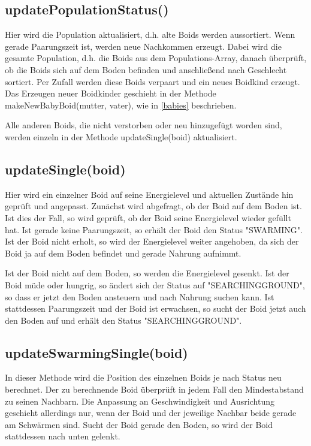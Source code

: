 \documentclass[draft=false
              ,paper=a4
              ,twoside=false
              ,fontsize=11pt
              ,headsepline
              ,BCOR10mm
              ,DIV11
              ,bibtotoc
              ,liststotoc
              ]{scrbook}
\begin{document}
\subsection{updatePopulationStatus()}
 Hier wird die Population aktualisiert, d.h. alte Boids werden aussortiert. Wenn gerade Paarungszeit ist, werden neue Nachkommen erzeugt. Dabei wird die gesamte Population, d.h. die Boids aus dem Populations-Array, danach überprüft, ob die Boids sich auf dem Boden befinden und anschließend nach Geschlecht sortiert. Per Zufall werden diese Boids verpaart und ein neues Boidkind erzeugt. Das Erzeugen neuer Boidkinder geschieht in der Methode makeNewBabyBoid(mutter, vater), wie in \ref{babies} beschrieben.

Alle anderen Boids, die nicht verstorben oder neu hinzugefügt worden sind, werden einzeln in der Methode updateSingle(boid) aktualisiert.

\subsection{updateSingle(boid)}
 Hier wird ein einzelner Boid auf seine Energielevel und aktuellen Zustände hin geprüft und angepasst. Zunächst wird abgefragt, ob der Boid auf dem Boden ist. Ist dies der Fall, so wird geprüft, ob der Boid seine Energielevel wieder gefüllt hat. Ist gerade keine Paarungszeit, so erhält der Boid den Status "{}SWARMING"{}. Ist der Boid nicht erholt, so wird der Energielevel weiter angehoben, da sich der Boid ja auf dem Boden befindet und gerade Nahrung aufnimmt.

Ist der Boid nicht auf dem Boden, so werden die Energielevel gesenkt. Ist der Boid müde oder hungrig, so ändert sich der Status auf "{}SEARCHINGGROUND"{}, so dass er jetzt den Boden ansteuern und nach Nahrung suchen kann.
Ist stattdessen Paarungszeit und der Boid ist erwachsen, so sucht der Boid jetzt auch den Boden auf und erhält den Status "{}SEARCHINGGROUND"{}.

\subsection{updateSwarmingSingle(boid)}\label{swarmmethod}
In dieser Methode wird die Position des einzelnen Boids je nach Status neu berechnet. Der zu berechnende Boid überprüft in jedem Fall den Mindestabstand zu seinen Nachbarn. Die Anpassung an Geschwindigkeit und Ausrichtung geschieht allerdings nur, wenn der Boid und der jeweilige Nachbar beide gerade am Schwärmen sind. Sucht der Boid gerade den Boden, so wird der Boid stattdessen nach unten gelenkt.
\end{document}

